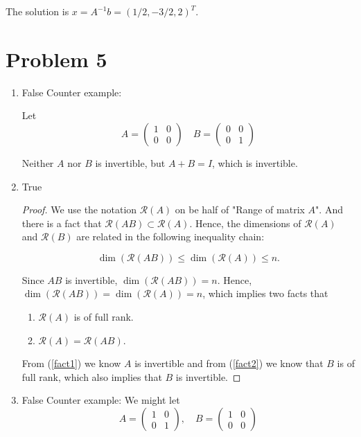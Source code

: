\documentclass[12pt]{article}
\begin{document}
The solution is $x = A^{-1}b = (1/2, -3/2, 2)^T$.


\section{Problem 5}
\begin{enumerate}
\item False
Counter example:

Let 
$$
A = \begin{pmatrix}
1 & 0 \\
0 & 0
\end{pmatrix} \quad
B = \begin{pmatrix}
0 & 0 \\
0 & 1
\end{pmatrix} 
$$

Neither $A$ nor $B$ is invertible, but $A + B = I$, which is invertible.

\item True
\begin{proof}
We use the notation $\mathcal R (A)$ on be half of "Range of matrix $A$". And there is a fact that $\mathcal R (AB) \subset \mathcal R (A)$. Hence, the dimensions of $\mathcal R (A)$ and $\mathcal R(B)$ are related in the following inequality chain:

$$
\dim(\mathcal R(AB)) \leq \dim(\mathcal R(A)) \leq n.
$$

Since $AB$ is invertible, $\dim(\mathcal R(AB)) = n$. Hence, $\dim(\mathcal R(AB)) = \dim(\mathcal R(A)) = n$, which implies two facts that
\begin{enumerate}
\item\label{fact1} $\mathcal R(A)$ is of full rank.

\item\label{fact2} $\mathcal R(A) = \mathcal R(AB)$.
\end{enumerate}

From (\ref{fact1}) we know $A$ is invertible and from (\ref{fact2}) we know that $B$ is of full rank, which also implies that $B$ is invertible.
\end{proof}


\item False
Counter example:
We might let
$$
A = \begin{pmatrix}
1 & 0 \\
0 & 1
\end{pmatrix}, \quad
B = \begin{pmatrix}
1 & 0 \\
0 & 0
\end{pmatrix}
$$


\end{enumerate}
\end{document}
